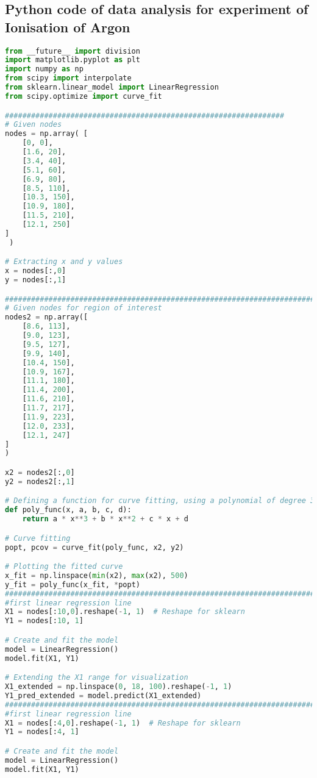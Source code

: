 \documentclass[a4paper,11pt]{article}
\begin{document}
\newpage
\subsection*{Python code of data analysis for experiment of Ionisation of Argon}
\begin{lstlisting}[language=Python]
from __future__ import division
import matplotlib.pyplot as plt
import numpy as np
from scipy import interpolate
from sklearn.linear_model import LinearRegression
from scipy.optimize import curve_fit

################################################################
# Given nodes
nodes = np.array( [
    [0, 0],
    [1.6, 20],
    [3.4, 40],
    [5.1, 60],
    [6.9, 80],
    [8.5, 110],
    [10.3, 150],
    [10.9, 180],
    [11.5, 210],
    [12.1, 250]
]
 )

# Extracting x and y values
x = nodes[:,0]
y = nodes[:,1]

############################################################################
# Given nodes for region of interest
nodes2 = np.array([
    [8.6, 113],
    [9.0, 123],
    [9.5, 127],
    [9.9, 140],
    [10.4, 150],
    [10.9, 167],
    [11.1, 180],
    [11.4, 200],
    [11.6, 210],
    [11.7, 217],
    [11.9, 223],
    [12.0, 233],
    [12.1, 247]
]
)

x2 = nodes2[:,0]
y2 = nodes2[:,1]

# Defining a function for curve fitting, using a polynomial of degree 3 as an example
def poly_func(x, a, b, c, d):
    return a * x**3 + b * x**2 + c * x + d

# Curve fitting
popt, pcov = curve_fit(poly_func, x2, y2)

# Plotting the fitted curve
x_fit = np.linspace(min(x2), max(x2), 500)
y_fit = poly_func(x_fit, *popt)
############################################################################
#first linear regression line
X1 = nodes[:10,0].reshape(-1, 1)  # Reshape for sklearn
Y1 = nodes[:10, 1]

# Create and fit the model
model = LinearRegression()
model.fit(X1, Y1)

# Extending the X1 range for visualization
X1_extended = np.linspace(0, 18, 100).reshape(-1, 1)
Y1_pred_extended = model.predict(X1_extended)
#############################################################################
#first linear regression line
X1 = nodes[:4,0].reshape(-1, 1)  # Reshape for sklearn
Y1 = nodes[:4, 1]

# Create and fit the model
model = LinearRegression()
model.fit(X1, Y1)


\end{lstlisting}
\end{document}
